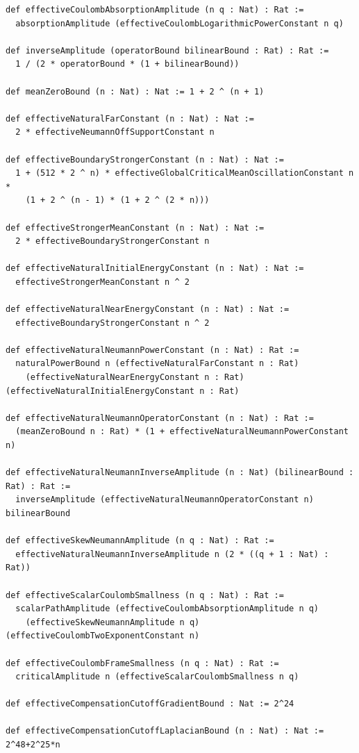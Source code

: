 \documentclass[11pt,a4paper]{article}
\numberwithin{equation}{section}
\theoremstyle{definition}
\theoremstyle{remark}
\begin{document}
\begin{lstlisting}
def effectiveCoulombAbsorptionAmplitude (n q : Nat) : Rat :=
  absorptionAmplitude (effectiveCoulombLogarithmicPowerConstant n q)

def inverseAmplitude (operatorBound bilinearBound : Rat) : Rat :=
  1 / (2 * operatorBound * (1 + bilinearBound))

def meanZeroBound (n : Nat) : Nat := 1 + 2 ^ (n + 1)

def effectiveNaturalFarConstant (n : Nat) : Nat :=
  2 * effectiveNeumannOffSupportConstant n

def effectiveBoundaryStrongerConstant (n : Nat) : Nat :=
  1 + (512 * 2 ^ n) * effectiveGlobalCriticalMeanOscillationConstant n *
    (1 + 2 ^ (n - 1) * (1 + 2 ^ (2 * n)))

def effectiveStrongerMeanConstant (n : Nat) : Nat :=
  2 * effectiveBoundaryStrongerConstant n

def effectiveNaturalInitialEnergyConstant (n : Nat) : Nat :=
  effectiveStrongerMeanConstant n ^ 2

def effectiveNaturalNearEnergyConstant (n : Nat) : Nat :=
  effectiveBoundaryStrongerConstant n ^ 2

def effectiveNaturalNeumannPowerConstant (n : Nat) : Rat :=
  naturalPowerBound n (effectiveNaturalFarConstant n : Rat)
    (effectiveNaturalNearEnergyConstant n : Rat) (effectiveNaturalInitialEnergyConstant n : Rat)

def effectiveNaturalNeumannOperatorConstant (n : Nat) : Rat :=
  (meanZeroBound n : Rat) * (1 + effectiveNaturalNeumannPowerConstant n)

def effectiveNaturalNeumannInverseAmplitude (n : Nat) (bilinearBound : Rat) : Rat :=
  inverseAmplitude (effectiveNaturalNeumannOperatorConstant n) bilinearBound

def effectiveSkewNeumannAmplitude (n q : Nat) : Rat :=
  effectiveNaturalNeumannInverseAmplitude n (2 * ((q + 1 : Nat) : Rat))

def effectiveScalarCoulombSmallness (n q : Nat) : Rat :=
  scalarPathAmplitude (effectiveCoulombAbsorptionAmplitude n q)
    (effectiveSkewNeumannAmplitude n q) (effectiveCoulombTwoExponentConstant n)

def effectiveCoulombFrameSmallness (n q : Nat) : Rat :=
  criticalAmplitude n (effectiveScalarCoulombSmallness n q)

def effectiveCompensationCutoffGradientBound : Nat := 2^24

def effectiveCompensationCutoffLaplacianBound (n : Nat) : Nat := 2^48+2^25*n


\end{lstlisting}
\end{document}
